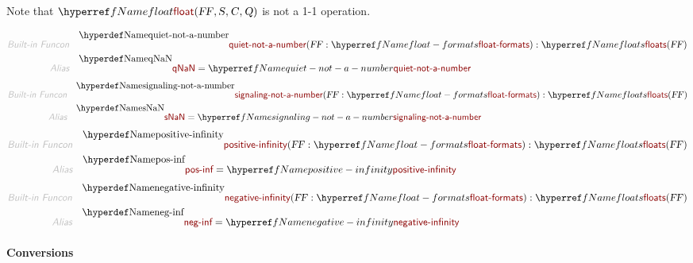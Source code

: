 Note that $\SHADE{\NAMEREF{float}
           (  \VAR{FF}, 
                  \VAR{S}, 
                  \VAR{C}, 
                  \VAR{Q} )}$ is not a 1-1 operation.

\begin{align*}
  \KEY{Built-in Funcon} \quad
  & \NAMEDECL{quiet-not-a-number}(
                       \VAR{FF} : \NAMEREF{float-formats}) 
    : \NAMEREF{floats}
        (  \VAR{FF} ) 
\\
  \KEY{Alias} \quad
  & \NAMEDECL{qNaN} = \NAMEREF{quiet-not-a-number}
\end{align*}
\begin{align*}
  \KEY{Built-in Funcon} \quad
  & \NAMEDECL{signaling-not-a-number}(
                       \VAR{FF} : \NAMEREF{float-formats}) 
    : \NAMEREF{floats}
        (  \VAR{FF} ) 
\\
  \KEY{Alias} \quad
  & \NAMEDECL{sNaN} = \NAMEREF{signaling-not-a-number}
\end{align*}
\begin{align*}
  \KEY{Built-in Funcon} \quad
  & \NAMEDECL{positive-infinity}(
                       \VAR{FF} : \NAMEREF{float-formats}) 
    : \NAMEREF{floats}
        (  \VAR{FF} ) 
\\
  \KEY{Alias} \quad
  & \NAMEDECL{pos-inf} = \NAMEREF{positive-infinity}
\end{align*}
\begin{align*}
  \KEY{Built-in Funcon} \quad
  & \NAMEDECL{negative-infinity}(
                       \VAR{FF} : \NAMEREF{float-formats}) 
    : \NAMEREF{floats}
        (  \VAR{FF} ) 
\\
  \KEY{Alias} \quad
  & \NAMEDECL{neg-inf} = \NAMEREF{negative-infinity}
\end{align*}
\paragraph{Conversions}\hypertarget{conversions}{}\label{conversions}

